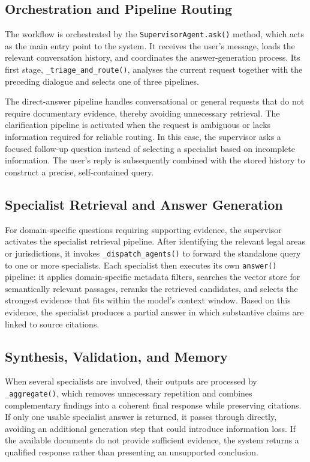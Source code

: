 \documentclass[a4paper,12pt]{report}
\begin{document}
\subsection{Orchestration and Pipeline Routing}

The workflow is orchestrated by the \texttt{SupervisorAgent.ask()} method, which acts as the main entry point to the system. It receives the user's message, loads the relevant conversation history, and coordinates the answer-generation process. Its first stage, \texttt{\_triage\_and\_route()}, analyses the current request together with the preceding dialogue and selects one of three pipelines.

The direct-answer pipeline handles conversational or general requests that do not require documentary evidence, thereby avoiding unnecessary retrieval. The clarification pipeline is activated when the request is ambiguous or lacks information required for reliable routing. In this case, the supervisor asks a focused follow-up question instead of selecting a specialist based on incomplete information. The user's reply is subsequently combined with the stored history to construct a precise, self-contained query.

\subsection{Specialist Retrieval and Answer Generation}

For domain-specific questions requiring supporting evidence, the supervisor activates the specialist retrieval pipeline. After identifying the relevant legal areas or jurisdictions, it invokes \texttt{\_dispatch\_agents()} to forward the standalone query to one or more specialists. Each specialist then executes its own \texttt{answer()} pipeline: it applies domain-specific metadata filters, searches the vector store for semantically relevant passages, reranks the retrieved candidates, and selects the strongest evidence that fits within the model's context window. Based on this evidence, the specialist produces a partial answer in which substantive claims are linked to source citations.

\subsection{Synthesis, Validation, and Memory}

When several specialists are involved, their outputs are processed by \texttt{\_aggregate()}, which removes unnecessary repetition and combines complementary findings into a coherent final response while preserving citations. If only one usable specialist answer is returned, it passes through directly, avoiding an additional generation step that could introduce information loss. If the available documents do not provide sufficient evidence, the system returns a qualified response rather than presenting an unsupported conclusion.
\end{document}
